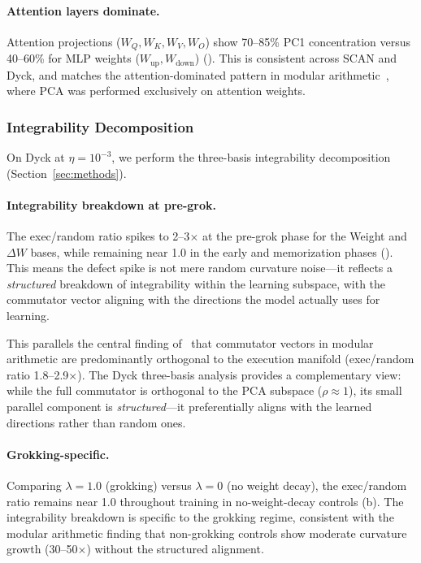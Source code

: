 \documentclass[11pt]{article}
\begin{document}
\paragraph{Attention layers dominate.} Attention projections ($W_Q, W_K, W_V, W_O$) show 70--85\% PC1 concentration versus 40--60\% for MLP weights ($W_{\text{up}}, W_{\text{down}}$) (). This is consistent across SCAN and Dyck, and matches the attention-dominated pattern in modular arithmetic~\citep{xu2026integrability}, where PCA was performed exclusively on attention weights.

\subsubsection{Integrability Decomposition}
\label{sec:integrability}

On Dyck at $\eta = 10^{-3}$, we perform the three-basis integrability decomposition (Section~\ref{sec:methods}).

\paragraph{Integrability breakdown at pre-grok.} The exec/random ratio spikes to 2--3$\times$ at the pre-grok phase for the Weight and $\Delta W$ bases, while remaining near 1.0 in the early and memorization phases (). This means the defect spike is not mere random curvature noise---it reflects a \emph{structured} breakdown of integrability within the learning subspace, with the commutator vector aligning with the directions the model actually uses for learning.

This parallels the central finding of~\citet{xu2026integrability} that commutator vectors in modular arithmetic are predominantly orthogonal to the execution manifold (exec/random ratio 1.8--2.9$\times$). The Dyck three-basis analysis provides a complementary view: while the full commutator is orthogonal to the PCA subspace ($\rho \approx 1$), its small parallel component is \emph{structured}---it preferentially aligns with the learned directions rather than random ones.

\paragraph{Grokking-specific.} Comparing $\lambda = 1.0$ (grokking) versus $\lambda = 0$ (no weight decay), the exec/random ratio remains near 1.0 throughout training in no-weight-decay controls (b). The integrability breakdown is specific to the grokking regime, consistent with the modular arithmetic finding that non-grokking controls show moderate curvature growth (30--50$\times$) without the structured alignment.
\end{document}
